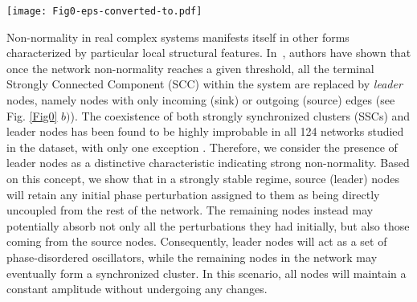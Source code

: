 \documentclass[prx,twocolumn,amsmath,noshowkeys,noshowpacs,amssymb]{revtex4-2}
\begin{document}
\begin{figure*}[t]
	\centering
	\texttt{[image: Fig0-eps-converted-to.pdf]}
	\caption{\textbf{Schematic representation of chimera pattern formation and leader nodes.} \textbf{a)} The process follows a symmetry-breaking mechanism where the perturbation leave the unstable synchronized manifold (red empty circle) following the direction of the critical eigenvector (red arrow {solid and shaded}) and reaches the stable chimera state (blue filled circle) through a (quasi)linear orbit (black dashed line). \textbf{b)} Once the non-normality reaches a given threshold the terminal Strongly Connected Components (SCC) (orange curve) disappear to make space to the leader nodes (green curve).}
	\label{Fig0}
\end{figure*}


Non-normality in real complex systems manifests itself in other forms characterized by particular local structural features. In~\cite{OBrien_NN}, authors have shown that once the network non-normality reaches a given threshold, all the terminal Strongly Connected Component (SCC) within the system are replaced by \emph{leader} nodes, namely nodes with only incoming (sink) or outgoing (source) edges (see Fig. \ref{Fig0} $b)$). The coexistence of both strongly synchronized clusters (SSCs) and leader nodes has been found to be highly improbable in all 124 networks studied in the dataset, with only one exception \cite{OBrien_NN}. Therefore, we consider the presence of leader nodes as a distinctive characteristic indicating strong non-normality. Based on this concept, we show that in a strongly stable regime, source (leader) nodes will retain any initial phase perturbation assigned to them as being directly uncoupled from the rest of the network. The remaining nodes instead may potentially absorb not only all the perturbations they had initially, but also those coming from the source nodes. Consequently, leader nodes will act as a set of phase-disordered oscillators, while the remaining nodes in the network may eventually form a synchronized cluster. In this scenario, all nodes will maintain a constant amplitude without undergoing any changes.
\end{document}
